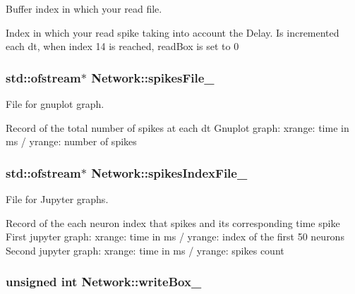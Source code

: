 Buffer index in which your read file. 

Index in which your read spike taking into account the Delay. Is incremented each dt, when index 14 is reached, read\-Box is set to 0 \hypertarget{classNetwork_a93e82bb1f3a243c36658f17d7579312a}{
\subsubsection[{spikes\-File\-\_\-}]{\setlength{\rightskip}{0pt plus 5cm}std\-::ofstream$\ast$ Network\-::spikes\-File\-\_\-\hspace{0.3cm}{\ttfamily [private]}}}\label{classNetwork_a93e82bb1f3a243c36658f17d7579312a}


File for gnuplot graph. 

Record of the total number of spikes at each dt Gnuplot graph\-: xrange\-: time in ms / yrange\-: number of spikes \hypertarget{classNetwork_ae1ca8efaa48617ef6114c101227f6ac0}{
\subsubsection[{spikes\-Index\-File\-\_\-}]{\setlength{\rightskip}{0pt plus 5cm}std\-::ofstream$\ast$ Network\-::spikes\-Index\-File\-\_\-\hspace{0.3cm}{\ttfamily [private]}}}\label{classNetwork_ae1ca8efaa48617ef6114c101227f6ac0}


File for Jupyter graphs. 

Record of the each neuron index that spikes and its corresponding time spike First jupyter graph\-: xrange\-: time in ms / yrange\-: index of the first 50 neurons Second jupyter graph\-: xrange\-: time in ms / yrange\-: spikes count \hypertarget{classNetwork_a431377135d1e87dd3c2481308909cf96}{
\subsubsection[{write\-Box\-\_\-}]{\setlength{\rightskip}{0pt plus 5cm}unsigned int Network\-::write\-Box\-\_\-\hspace{0.3cm}{\ttfamily [private]}}}\label{classNetwork_a431377135d1e87dd3c2481308909cf96}


